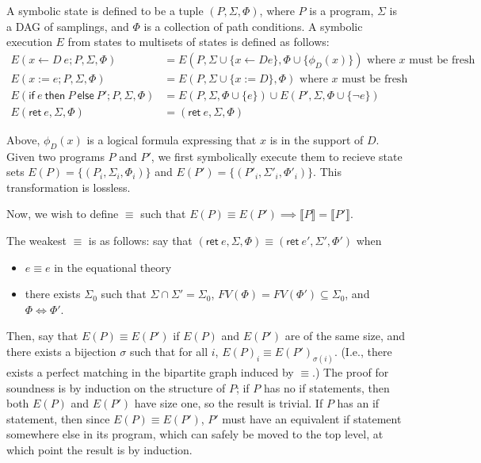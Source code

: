 \documentclass{article}
\newcommand{\eif}{\textsf{if}\ }
\newcommand{\ethen}{\textsf{then}\ }
\newcommand{\eelse}{\textsf{else}\ }
\newcommand{\eret}{\textsf{ret}\ }
\begin{document}
    A symbolic state is defined to be a tuple $(P, \Sigma, \Phi)$, where $P$ is a program, $\Sigma$ is a DAG of samplings, and $\Phi$ is a collection of path conditions. A symbolic execution $E$ from states to multisets of states is defined as follows:
    \begin{align*}
        E(x \leftarrow D\ e; P, \Sigma, \Phi) &= E(P, \Sigma \cup \{x \leftarrow D e\}, \Phi \cup \{\phi_D(x)\}) \text{ where $x$ must be fresh } \\
        E(x := e; P, \Sigma, \Phi) &= E(P, \Sigma \cup \{x := D\}, \Phi) \text{ where $x$ must be fresh} \\
        E(\eif e\ \ethen P\ \eelse P'; P, \Sigma, \Phi) &= E(P, \Sigma, \Phi \cup \{e\}) \cup E(P', \Sigma, \Phi \cup \{\neg e\}) \\
        E(\eret e, \Sigma, \Phi) &= (\eret e, \Sigma, \Phi)
    \end{align*}


        
    Above, $\phi_D(x)$ is a logical formula expressing that $x$ is in the support of $D$. Given two programs $P$ and $P'$, we first symbolically execute them to recieve state sets $E(P) = \{(P_i, \Sigma_i, \Phi_i)\}$ and $E(P') = \{(P'_i, \Sigma'_i, \Phi'_i)\}$. This transformation is lossless.

    Now, we wish to define $\equiv$ such that $E(P) \equiv E(P') \implies \llbracket P \rrbracket = \llbracket P' \rrbracket$.

    The weakest $\equiv$ is as follows: say that $(\eret e, \Sigma, \Phi) \equiv (\eret e', \Sigma', \Phi')$ when
    \begin{itemize}
        \item $e \equiv e$ in the equational theory
        \item there exists $\Sigma_0$ such that $\Sigma \cap \Sigma' = \Sigma_0$, $FV(\Phi) = FV(\Phi') \subseteq \Sigma_0$, and $\Phi \iff \Phi'$.
    \end{itemize}
    

    Then, say that $E(P) \equiv E(P')$ if $E(P)$ and $E(P')$ are of the same size, and there exists a bijection $\sigma$ such that for all $i$, $E(P)_i \equiv E(P')_{\sigma(i)}$. (I.e., there exists a perfect matching in the bipartite graph induced by $\equiv$.) The proof for soundness is by induction on the structure of $P$; if $P$ has no if statements, then both $E(P)$ and $E(P')$ have size one, so the result is trivial. If $P$ has an if statement, then since $E(P) \equiv E(P')$, $P'$ must have an equivalent if statement somewhere else in its program, which can safely be moved to the top level, at which point the result is by induction.
    
\end{document}

